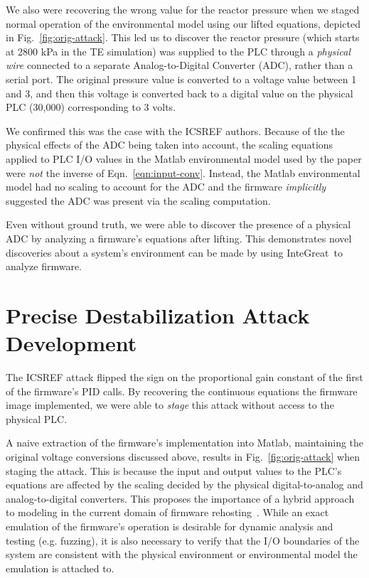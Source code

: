 We also were recovering the wrong value for the reactor pressure when we staged normal operation of the environmental model using our lifted equations, depicted in Fig.~\ref{fig:orig-attack}.
This led us to discover the reactor pressure (which starts at 2800 kPa in the TE simulation) was supplied to the PLC through a \emph{physical wire} connected to a separate Analog-to-Digital Converter (ADC), rather than a serial port.
The original pressure value is converted to a voltage value between 1 and 3, and then this voltage is converted back to a digital value on the physical PLC (30,000) corresponding to 3 volts.

We confirmed this was the case with the ICSREF authors.
Because of the the physical effects of the ADC being taken into account, the scaling equations applied to PLC I/O values in the Matlab environmental model used by the paper were \emph{not} the inverse of Eqn.~\ref{eqn:input-conv}.
Instead, the Matlab environmental model had no scaling to account for the ADC and the firmware \emph{implicitly} suggested the ADC was present via the scaling computation.

Even without ground truth, we were able to discover the presence of a physical ADC by analyzing a firmware's equations after lifting.
This demonstrates novel discoveries about a system's environment can be made by using InteGreat\ to analyze firmware.

\section{Precise Destabilization Attack Development}
The ICSREF attack flipped the sign on the proportional gain constant of the first of the firmware's PID calls.
By recovering the continuous equations the firmware image implemented, we were able to \emph{stage} this attack without access to the physical PLC.

A naive extraction of the firmware's implementation into Matlab, maintaining the original voltage conversions discussed above, results in Fig.~\ref{fig:orig-attack} when staging the attack.
This is because  the input and output values to the PLC's equations are affected by the scaling decided by the physical digital-to-analog and analog-to-digital converters.
This proposes the importance of a hybrid approach to modeling in the current domain of firmware rehosting~\cite{jetset,p2im,halucinator}.
While an exact emulation of the firmware's operation is desirable for dynamic analysis and testing (e.g. fuzzing), it is also necessary to verify that the I/O boundaries of the system are consistent with the physical environment or environmental model the emulation is attached to.


